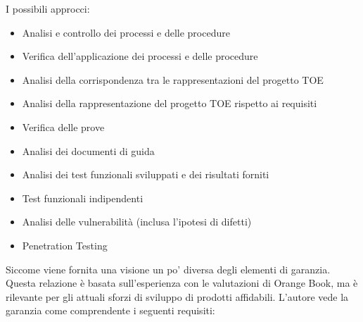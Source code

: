 I possibili approcci:
\begin{itemize}
    \item Analisi e controllo dei processi e delle procedure
    
    \item Verifica dell'applicazione dei processi e delle procedure

    \item Analisi della corrispondenza tra le rappresentazioni del progetto TOE
    
    \item Analisi della rappresentazione del progetto TOE rispetto ai requisiti
    
    \item Verifica delle prove
    
    \item Analisi dei documenti di guida
    
    \item Analisi dei test funzionali sviluppati e dei risultati forniti
    
    \item Test funzionali indipendenti
    
    \item Analisi delle vulnerabilità (inclusa l'ipotesi di difetti)
    
    \item Penetration Testing
\end{itemize}
Siccome viene fornita una visione un po' diversa degli elementi di garanzia. Questa relazione è basata sull'esperienza con le valutazioni di Orange Book, ma è rilevante per gli attuali sforzi di sviluppo di prodotti affidabili. L'autore vede la garanzia come comprendente i seguenti requisiti:
